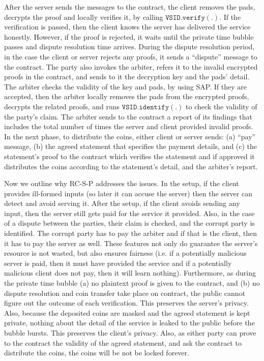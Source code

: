  After the server sends the messages to the contract, the client removes the pads, decrypts the proof and locally verifies it, by calling $\mathtt{VSID.verify}(.)$. If the verification is passed, then the client knows the server has delivered the service honestly. However, if the proof is rejected,  it waits until the private time bubble passes and dispute resolution time arrives. During the dispute resolution period, in the case the client or server  rejects any proofs, it sends a ``dispute'' message to the contract. The party also invokes the arbiter,  refers it to the invalid encrypted proofs in the contract, and  sends to it the decryption key and the pads' detail. The arbiter checks the validity of the key and pads, by using SAP. If they are accepted,  then the arbiter locally removes the pads from the encrypted proofs,   decrypts the related proofs, and runs $\mathtt{VSID.identify}(.)$ to check the validity of the party's claim. The arbiter sends to the contract a report of its findings that includes  the total number of times  the server and client provided invalid proofs. In the next phase, to distribute the coins, either client or server  sends: (a) ``pay'' message, (b) the agreed statement that specifies the payment details, and (c) the statement's proof to the contract which verifies the statement and if approved it distributes the coins according to the statement's detail, and the arbiter's report. 

Now we outline why RC-S-P addresses the issues.    In the setup, if the client provides ill-formed inputs (so later it can  accuse the server) then the server can detect and avoid serving it.  After the setup, if the client avoids sending any input,  then the server still gets paid for the service it provided. Also, in the case of a dispute between the parties, their claim is checked, and  the corrupt party is identified. The corrupt party has to pay the arbiter and if that is the client, then it has to pay the server as well.  These  features not only do guarantee the server's resource is not wasted, but also ensures fairness (i.e.  if a potentially malicious server is paid, then it must have provided the service and if a potentially malicious client does not pay, then it will learn nothing). Furthermore, as during the private time bubble  (a) no plaintext proof is given to the contract, and (b) no dispute resolution and coin transfer take place on contract, the public cannot figure out the outcome of each verification. This  preserves the server's privacy. Also, because the  deposited coins are masked and the agreed statement is kept private,   nothing about the detail of the service  is leaked to the public before the bubble bursts. This preserves the client's privacy. Also, as either party can prove to the contract the validity of the agreed statement, and ask the contract to distribute the coins, the coins will be not be locked forever. 

